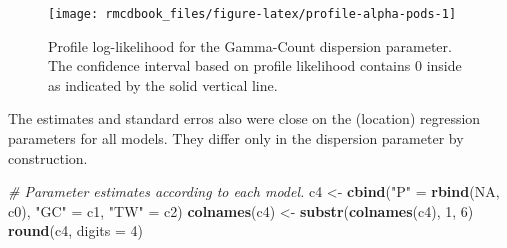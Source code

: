 \documentclass[9pt,a5paper,]{book}
\newenvironment{Shaded}{}{}
\newcommand{\KeywordTok}[1]{\textbf{{#1}}}
\newcommand{\DataTypeTok}[1]{\underline{{#1}}}
\newcommand{\DecValTok}[1]{{#1}}
\newcommand{\StringTok}[1]{{#1}}
\newcommand{\CommentTok}[1]{\textit{{#1}}}
\newcommand{\OtherTok}[1]{{#1}}
\newcommand{\NormalTok}[1]{{#1}}
\renewenvironment{Shaded}{\color{inputcolor}}{}
\renewcommand{\DataTypeTok}[1]{{#1}}
\theoremstyle{definition}
\theoremstyle{definition}
\theoremstyle{remark}
\begin{document}
\begin{figure}[h]

{\centering \texttt{[image: rmcdbook\_files/figure-latex/profile-alpha-pods-1]} 

}

\caption{Profile log-likelihood for the Gamma-Count dispersion parameter. The confidence interval based on profile likelihood contains 0 inside as indicated by the solid vertical line.}\label{fig:profile-alpha-pods}
\end{figure}

The estimates and standard erros also were close on the (location)
regression parameters for all models. They differ only in the dispersion
parameter by construction.

\begin{Shaded}
\end{Shaded}

\begin{Shaded}
\begin{Highlighting}[]
\CommentTok{# Parameter estimates according to each model.}
\NormalTok{c4 <-}\StringTok{ }\KeywordTok{cbind}\NormalTok{(}\StringTok{"P"} \NormalTok{=}\StringTok{ }\KeywordTok{rbind}\NormalTok{(}\OtherTok{NA}\NormalTok{, c0),}
            \StringTok{"GC"} \NormalTok{=}\StringTok{ }\NormalTok{c1,}
            \StringTok{"TW"} \NormalTok{=}\StringTok{ }\NormalTok{c2)}
\KeywordTok{colnames}\NormalTok{(c4) <-}\StringTok{ }\KeywordTok{substr}\NormalTok{(}\KeywordTok{colnames}\NormalTok{(c4), }\DecValTok{1}\NormalTok{, }\DecValTok{6}\NormalTok{)}
\KeywordTok{round}\NormalTok{(c4, }\DataTypeTok{digits =} \DecValTok{4}\NormalTok{)}
\end{Highlighting}
\end{Shaded}
\end{document}

